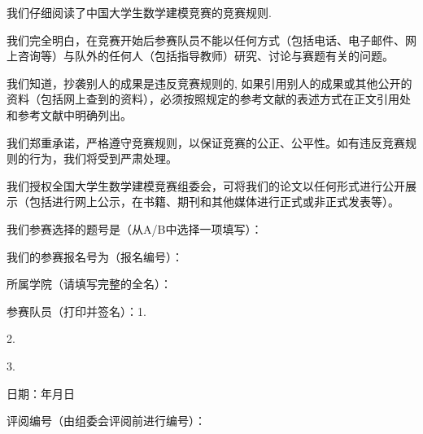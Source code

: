 \documentclass{article}
\begin{document}
	{

		我们仔细阅读了中国大学生数学建模竞赛的竞赛规则.

		我们完全明白，在竞赛开始后参赛队员不能以任何方式（包括电话、电子邮件、网上咨询等）与队外的任何人（包括指导教师）研究、讨论与赛题有关的问题。

		我们知道，抄袭别人的成果是违反竞赛规则的, 如果引用别人的成果或其他公开的资料（包括网上查到的资料），必须按照规定的参考文献的表述方式在正文引用处和参考文献中明确列出。

		我们郑重承诺，严格遵守竞赛规则，以保证竞赛的公正、公平性。如有违反竞赛规则的行为，我们将受到严肃处理。

		我们授权全国大学生数学建模竞赛组委会，可将我们的论文以任何形式进行公开展示（包括进行网上公示，在书籍、期刊和其他媒体进行正式或非正式发表等）。

		我们参赛选择的题号是（从A/B中选择一项填写）：\underline{\makebox[12\ccwd][c]{\NumberProblem}}

		我们的参赛报名号为（报名编号）：\underline{\makebox[12\ccwd][c]{\NumberNJUSTMathModeling}}

		所属学院（请填写完整的全名）：\underline{\makebox[20\ccwd][c]{\MembersCollege}}

		参赛队员（打印并签名）：1.\underline{\makebox[12\ccwd][c]{\MemberOne}}

		\makebox[11.5\ccwd][c]{}2.\underline{\makebox[12\ccwd][c]{\MemberTwo}}

		\makebox[11.5\ccwd][c]{}3.\underline{\makebox[12\ccwd][c]{\MemberThree}}

		\begin{flushright}
			日期：\underline{\makebox[4\ccwd][c]{\Year}}年\underline{\makebox[4\ccwd][c]{\Month}}月\underline{\makebox[4\ccwd][c]{\Day}}日
		\end{flushright}

	}

	\hrulefill

	{评阅编号（由组委会评阅前进行编号）：}

	\restoregeometry
	\setcounter{page}{1}

\fi


\maketitle
\end{document}
